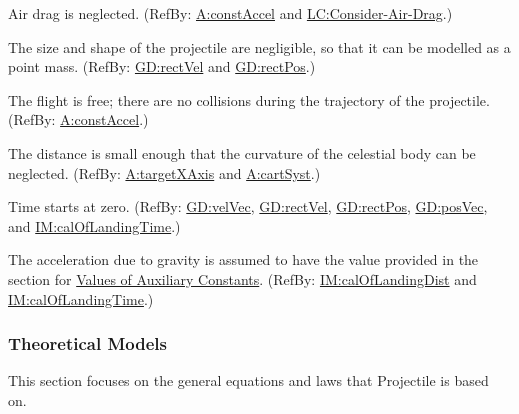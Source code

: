\documentclass[12pt]{article}
\begin{document}
\begin{description}[font=\normalfont]
\item[neglectDrag:\phantomsection\label{neglectDrag}]{Air drag is neglected. (RefBy: \hyperref[constAccel]{A:constAccel} and \hyperref[considerAirDrag]{LC:Consider-Air-Drag}.)}
\item[pointMass:\phantomsection\label{pointMass}]{The size and shape of the projectile are negligible, so that it can be modelled as a point mass. (RefBy: \hyperref[GD:rectVel]{GD:rectVel} and \hyperref[GD:rectPos]{GD:rectPos}.)}
\item[freeFlight:\phantomsection\label{freeFlight}]{The flight is free; there are no collisions during the trajectory of the projectile. (RefBy: \hyperref[constAccel]{A:constAccel}.)}
\item[neglectCurv:\phantomsection\label{neglectCurv}]{The distance is small enough that the curvature of the celestial body can be neglected. (RefBy: \hyperref[targetXAxis]{A:targetXAxis} and \hyperref[cartSyst]{A:cartSyst}.)}
\item[timeStartZero:\phantomsection\label{timeStartZero}]{Time starts at zero. (RefBy: \hyperref[GD:velVec]{GD:velVec}, \hyperref[GD:rectVel]{GD:rectVel}, \hyperref[GD:rectPos]{GD:rectPos}, \hyperref[GD:posVec]{GD:posVec}, and \hyperref[IM:calOfLandingTime]{IM:calOfLandingTime}.)}
\item[gravAccelValue:\phantomsection\label{gravAccelValue}]{The acceleration due to gravity is assumed to have the value provided in the section for \hyperref[Sec:AuxConstants]{Values of Auxiliary Constants}. (RefBy: \hyperref[IM:calOfLandingDist]{IM:calOfLandingDist} and \hyperref[IM:calOfLandingTime]{IM:calOfLandingTime}.)}
\end{description}
\subsubsection{Theoretical Models}
\label{Sec:TMs}
This section focuses on the general equations and laws that Projectile is based on.
\end{document}
